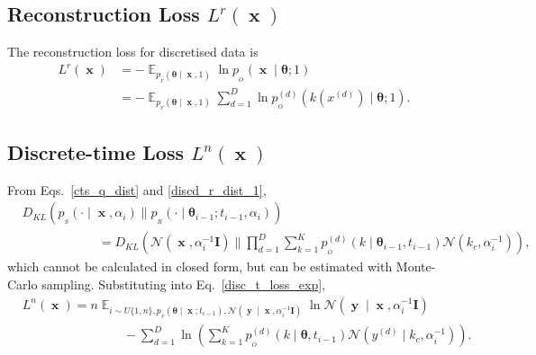 \documentclass[11pt,table]{article}
\DeclareMathOperator*{\E}{\mathbb{E}}
\DeclareMathOperator{\x}{\mathbf{x}}
\DeclareMathOperator{\y}{\mathbf{y}}
\newcommand{\kl}[2]{D_{KL}\left(#1 \parallel #2\right)}
\newcommand{\N}[2]{\mathcal{N}\left(#1 , #2\right)}
\newcommand{\I}[1]{\boldsymbol{I}}
\newcommand{\tidx}[2]{#1_{#2}}
\newcommand{\didx}[2]{#1^{(#2)}}
\renewcommand{\vec}[1]{\boldsymbol{#1}}
\newcommand{\pars}{\theta}
\newcommand{\parsn}{\vec{\pars}}
\newcommand{\parsnt}[1]{\tidx{\parsn}{#1}}
\newcommand{\alphat}[1]{\tidx{\alpha}{#1}}
\newcommand{\0}[1]{\constvec{0}{#1}}
\newcommand{\1}[1]{\constvec{1}{#1}}
\newcommand{\yd}{y}
\newcommand{\ydd}[1]{\didx{\yd}{#1}}
\newcommand{\xdd}[1]{\didx{x}{#1}}
\newcommand{\ds}[1]{\{1,#1\}}
\newcommand{\ui}[1]{U\ds{#1}}
\newcommand{\sender}[2]{p_{_S}\left(#1 \mid #2\right)}
\newcommand{\out}{p_{_O}}
\newcommand{\rec}{p_{_R}}
\newcommand{\flow}{p_{_F}}
\begin{document}
\subsection{Reconstruction Loss \texorpdfstring{$L^r(\x)$}{}}\label{sec:discd_reconstruction}
The reconstruction loss for discretised data is
\begin{align}
L^r(\x) &= -\E_{\flow(\parsn \mid \x, 1)} \ln \out(\x \mid \parsn; 1)\\
&= -\E_{\flow(\parsn \mid \x, 1)}\sum_{d=1}^D \ln \out^{(d)}\left(k(\xdd{d}) \mid \parsn; 1 \right).
\end{align}
\subsection{Discrete-time Loss \texorpdfstring{$L^{n}(\x)$}{}}
From Eqs.~\ref{cts_q_dist} and \ref{discd_r_dist_1},
\begin{align}
&\kl{\sender{\cdot}{\x, \alphat{i}}}{\rec(\cdot \mid \parsnt{i-1}; t_{i-1}, \alphat{i})}\\ 
&\qquad\qquad\qquad=\kl{\N{\x}{\alphat{i}^{-1}\I{D}}}{\prod_{d=1}^D\sum_{k=1}^K \out^{(d)}(k \mid \parsnt{i-1}, t_{i-1}) \N{k_c}{\alphat{i}^{-1}}},
\end{align}
which cannot be calculated in closed form, but can be estimated with Monte-Carlo sampling.
Substituting into Eq.~\ref{disc_t_loss_exp},
\begin{align}
&L^{n}(\x) = n \E_{i \sim \ui{n},\flow(\parsn \mid \x ; t_{i-1}),\N{\y \mid \x}{\alphat{i}^{-1}\I{D}}} \ln \N{\y \mid \x}{\alphat{i}^{-1}\I{D}}\\
&\qquad\qquad\qquad\qquad- \sum_{d=1}^D\ln \left(\sum_{k=1}^K \out^{(d)}(k \mid \parsn, t_{i-1}) \N{\ydd{d} \mid k_c}{\alphat{i}^{-1}}\right).\label{discd_disc_t_loss_exp}
\end{align}
\end{document}
